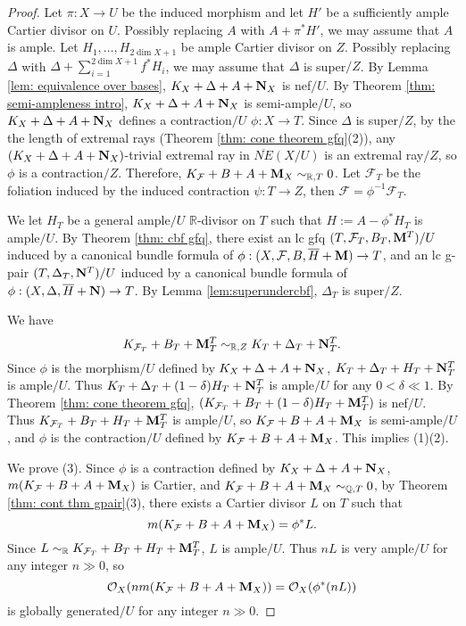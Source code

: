\documentclass[11pt]{amsart}
\numberwithin{equation}{section}
\newcommand{\Mm}{{\bf{M}}}
\newcommand{\Nn}{{\bf{N}}}
\newcommand{\Rr}{\mathbb{R}}
\newcommand{\Ff}{\mathcal{F}}
\theoremstyle{definition}
\theoremstyle{definition}
\theoremstyle{definition}
\begin{document}
\begin{proof}
Let $\pi: X\rightarrow U$ be the induced morphism and let $H'$ be a sufficiently ample Cartier divisor on $U$. Possibly replacing $A$ with $A+\pi^*H'$, we may assume that $A$ is ample.  Let $H_1,\dots,H_{2\dim X+1}$ be ample Cartier divisor on $Z$. Possibly replacing $\Delta$ with $\Delta+\sum_{i=1}^{2\dim X+1}f^*H_i$, we may assume that $\Delta$ is super$/Z$. By Lemma \ref{lem: equivalence over bases}, $K_{X}+\Delta+A+\Nn_X$ is nef$/U$.
By Theorem \ref{thm: semi-ampleness intro}, $K_{X}+\Delta+A+\Nn_X$ is semi-ample$/U$, so $K_{X}+\Delta+A+\Nn_X$ defines a contraction$/U$ $\phi: X\rightarrow T$. %
Since $\Delta$ is super$/Z$, by the the length of extremal rays (Theorem \ref{thm: cone theorem gfq}(2)), any $(K_{X}+\Delta+A+\Nn_X)$-trivial extremal ray in $\overline{NE}(X/U)$ is an extremal ray$/Z$, so $\phi$ is a contraction$/Z$. Therefore, $K_{\Ff}+B+A+\Mm_X\sim_{\mathbb R,T}0$. Let $\Ff_T$ be the foliation induced by the induced contraction $\psi: T\rightarrow Z$, then $\Ff=\phi^{-1}\Ff_T$. 

We let $H_T$ be a general ample$/U$ $\Rr$-divisor on $T$ such that $H:=A-\phi^*H_T$ is ample$/U$. By Theorem \ref{thm: cbf gfq}, there exist an lc gfq $(T,\Ff_T,B_T,\Mm^T)/U$ induced by a canonical bundle formula of $\phi: (X,\Ff,B,\overline{H}+\Mm)\rightarrow T$, and an lc g-pair $(T,\Delta_T,\Nn^T)/U$ induced by a canonical bundle formula of $\phi: (X,\Delta,\overline{H}+\Nn)\rightarrow T$. By Lemma \ref{lem:superundercbf}, $\Delta_T$ is super$/Z$.

We have
$$K_{\Ff_T}+B_T+\Mm^T_T\sim_{\mathbb R,Z}K_T+\Delta_T+\Nn^T_T.$$ 
Since $\phi$ is the morphism$/U$ defined by $K_{X}+\Delta+A+\Nn_X$, $K_T+\Delta_T+H_T+\Nn^T_T$ is ample$/U$. Thus $K_T+\Delta_T+(1-\delta)H_T+\Nn^T_T$ is ample$/U$ for any $0<\delta\ll 1$. By Theorem \ref{thm: cone theorem gfq}, $(K_{\Ff_T}+B_T+(1-\delta)H_T+\Mm^T_T)$ is nef$/U$. Thus $K_{\Ff_T}+B_T+H_T+\Mm^T_T$ is ample$/U$, so $K_{\Ff}+B+A+\Mm_X$ is semi-ample$/U$, and $\phi$ is the contraction$/U$ defined by $K_{\Ff}+B+A+\Mm_X$. This implies (1)(2). 

We prove (3). Since $\phi$ is a contraction defined by $K_X+\Delta+A+\Nn_X$, $m(K_{\Ff}+B+A+\Mm_X)$ is Cartier, and $K_{\Ff}+B+A+\Mm_X\sim_{\mathbb Q,T}0$, by Theorem \ref{thm: cont thm gpair}(3), there exists a Cartier divisor $L$ on $T$ such that
$$m(K_{\Ff}+B+A+\Mm_X)=\phi^*L.$$
Since $L\sim_{\mathbb R}K_{\Ff_T}+B_T+H_T+\Mm^T_T$, $L$ is ample$/U$. Thus $nL$ is very ample$/U$ for any integer $n\gg 0$, so 
$$\mathcal{O}_X(nm(K_{\Ff}+B+A+\Mm_X))=\mathcal{O}_X(\phi^*(nL))$$
is globally generated$/U$ for any integer $n\gg 0$.
\end{proof}
\end{document}
